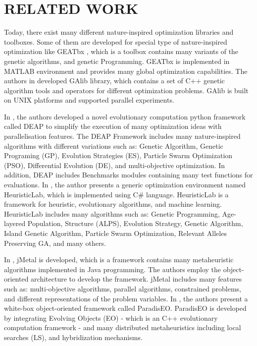 \documentclass[a4paper,twoside]{article}
\begin{document}
\section{\uppercase{Related Work}}
Today, there exist many different nature-inspired optimization libraries and toolboxes. Some of them are developed for special type of nature-inspired optimization like GEATbx \cite{GEATbx}, which is a toolbox contains many variants of the genetic algorithms, and genetic Programming. GEATbx is implemented in MATLAB environment and provides many global optimization capabilities. The authors in \cite {GAlib} developed GAlib library, which contains a set of C++ genetic algorithm tools and operators for different optimization problems. GAlib is built on UNIX platforms and supported parallel experiments. 

In \cite {DEAP_JMLR2012}, the authors developed a novel evolutionary computation python framework called DEAP to simplify the execution of many optimization ideas with  parallelisation features. The DEAP Framework includes many nature-inspired algorithms with different variations such as: Genetic Algorithm, Genetic Programing (GP), Evolution Strategies (ES), Particle Swarm Optimization (PSO), Differential Evolution (DE), and multi-objective optimization. In addition, DEAP includes Benchmarks modules containing many test functions for evaluations. In \cite{Wagner04}, the author presents a generic optimization environment named HeuristicLab, which is implemented using C\# language. HeuristicLab is a framework for heuristic, evolutionary algorithms, and machine learning. HeuristicLab includes many algorithms such as: Genetic Programming, Age-layered Population, Structure (ALPS), Evolution Strategy, Genetic Algorithm, Island Genetic Algorithm, Particle Swarm Optimization, Relevant Alleles Preserving GA, and many others. 

In \cite{Durillo2011}, jMetal is developed, which is a framework contains many metaheuristic algorithms implemented in Java programming. The authors employ the object-oriented architecture to develop the framework. jMetal includes many features such as: multi-objective algorithms, parallel algorithms, constrained problems, and different representations of the problem variables. In \cite{Cahon2004,humeau13}, the authors present a white-box object-oriented framework called ParadisEO. ParadisEO is developed by integrating Evolving Objects (EO) - which is an C++ evolutionary computation framework - and many distributed metaheuristics including local searches (LS), and hybridization mechanisms.  
\end{document}
